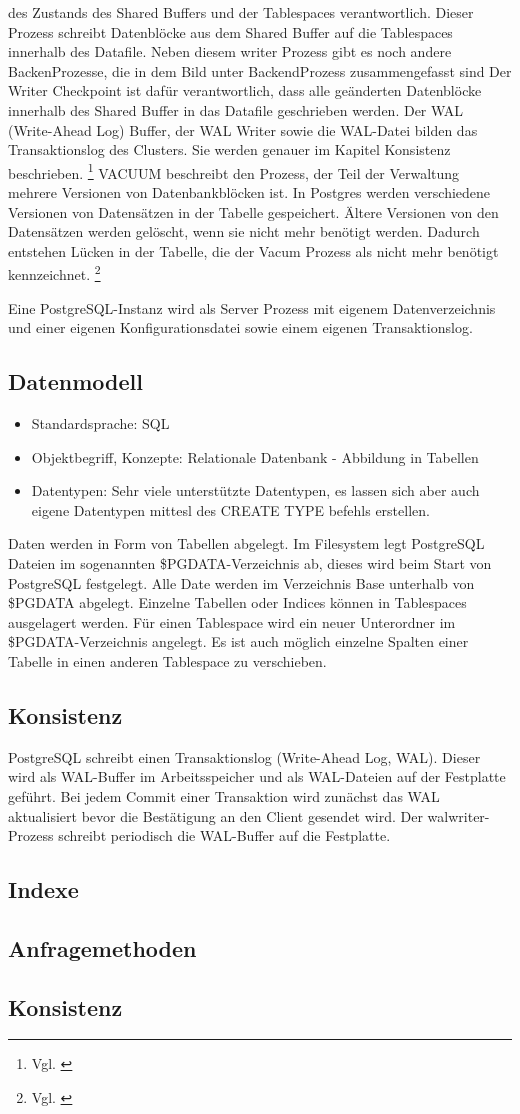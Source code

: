     des Zustands des Shared Buffers und der Tablespaces verantwortlich. Dieser Prozess schreibt Datenblöcke aus dem Shared Buffer auf die Tablespaces innerhalb des Datafile. Neben diesem writer Prozess gibt es noch andere BackenProzesse, die in dem Bild unter BackendProzess zusammengefasst sind
    Der Writer Checkpoint ist dafür verantwortlich, dass alle geänderten Datenblöcke innerhalb des Shared Buffer in das Datafile geschrieben werden. Der WAL (Write-Ahead Log) Buffer, der WAL Writer sowie die WAL-Datei bilden das Transaktionslog des Clusters. Sie werden genauer im Kapitel Konsistenz beschrieben.
    \footnote{Vgl. \cite[Seite 26]{froehlich01}} VACUUM beschreibt den Prozess, der Teil der Verwaltung mehrere Versionen
    von Datenbankblöcken ist. In Postgres werden verschiedene Versionen von Datensätzen in der Tabelle gespeichert. Ältere Versionen von den Datensätzen werden gelöscht, wenn sie nicht mehr benötigt werden. Dadurch entstehen
    Lücken in der Tabelle, die der Vacum Prozess als nicht mehr benötigt kennzeichnet. \footnote{Vgl. \cite[Seite 37]{froehlich01}}

    Eine PostgreSQL-Instanz wird als Server Prozess mit eigenem Datenverzeichnis und einer eigenen Konfigurationsdatei sowie einem eigenen Transaktionslog.
\subsection{Datenmodell}
    \begin{itemize}
        \item Standardsprache: SQL
        \item Objektbegriff, Konzepte: Relationale Datenbank - Abbildung in Tabellen
        \item Datentypen:
        \subitem Sehr viele unterstützte Datentypen, es lassen sich aber auch eigene Datentypen mittesl des CREATE TYPE befehls erstellen.\cite{postgres8}
    \end{itemize}
    Daten werden in Form von Tabellen abgelegt. Im Filesystem legt PostgreSQL Dateien im sogenannten \$PGDATA-Verzeichnis ab, dieses wird beim Start von PostgreSQL festgelegt. Alle Date werden im Verzeichnis Base unterhalb von \$PGDATA abgelegt. Einzelne Tabellen oder Indices können in Tablespaces ausgelagert werden. Für einen Tablespace wird ein neuer Unterordner im \$PGDATA-Verzeichnis angelegt. Es ist auch möglich einzelne Spalten einer Tabelle in einen anderen Tablespace zu verschieben.
\subsection{Konsistenz}
PostgreSQL schreibt einen Transaktionslog (Write-Ahead Log, WAL).
Dieser wird als WAL-Buffer im Arbeitsspeicher und als WAL-Dateien auf der Festplatte geführt.
Bei jedem Commit einer Transaktion wird zunächst das WAL aktualisiert bevor die Bestätigung an den Client gesendet wird.
Der walwriter-Prozess schreibt periodisch die WAL-Buffer auf die Festplatte.
\subsection{Indexe}
\subsection{Anfragemethoden}
\subsection{Konsistenz}


